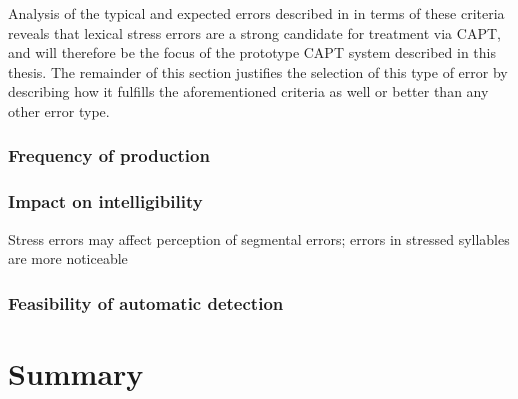 	Analysis of the typical and expected errors described in \label{sec:CAPT4FG:comparison} in terms of these criteria reveals that lexical stress errors are a strong candidate for treatment via CAPT, and will therefore be the focus of the prototype CAPT system described in this thesis. The remainder of this section justifies the selection of this type of error by describing how it fulfills the aforementioned criteria as well or better than any other error type.
	

	

		
		\subsubsection{Frequency of production}
		\citep{Cutler2008}
		
		\citep{Peperkamp2002, Dupoux2001, Dupoux2008}
		
		\subsubsection{Impact on intelligibility}
		\citep{Warren2009}
		
		\citep{Magen1998}
		
		Stress errors may affect perception of segmental errors; errors in stressed syllables are more noticeable \citep{Cutler2008}
		
		\subsubsection{Feasibility of automatic detection}
		\citep{ISADEPT, delmonte2011}
		
		\citep{Bonneau2011}
		
		\citep{Shahin2012a}
		
\section{Summary}